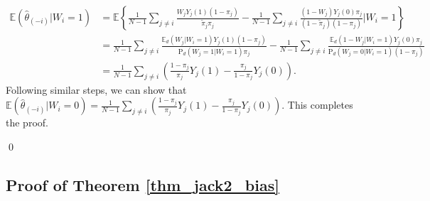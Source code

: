 \documentclass[12pt]{article}
\newcommand{\E}{{\mathbb{E}}}
\renewcommand{\Pr}{{\text{P}}}
\begin{document}
\begin{align}
\E(\hat{\theta}_{(-i)}|W_i = 1) &= \E\left\{\frac{1}{N-1}\sum_{j\neq i}\frac{W_jY_j(1)(1-\pi_j)}{\tilde{\pi}_j \pi_j} - \frac{1}{N-1}\sum_{j\neq i}\frac{(1-W_j)Y_j(0) {\pi}_j}{(1-\tilde{\pi}_j)(1-\pi_j)} \Bigg|W_i = 1 \right\} \nonumber\\
& = \frac{1}{N-1}\sum_{j\neq i}\frac{\E_d(W_j|W_i = 1)Y_j(1)(1-\pi_j)}{\Pr_d(W_j = 1|W_i = 1) \pi_j} - \frac{1}{N-1}\sum_{j\neq i}\frac{\E_d(1-W_j|W_i=1)Y_j(0) {\pi}_j}{\Pr_d(W_j = 0|W_i = 1)(1-\pi_j)} \nonumber\\
& = \frac{1}{N-1}\sum_{j \neq i}\left(\frac{1-\pi_j}{\pi_j}Y_j(1) - \frac{\pi_j}{1-\pi_j}Y_j(0)\right).
\end{align}
Following similar steps, we can show that $\E(\hat{\theta}_{(-i)}|W_i = 0) = \frac{1}{N-1}\sum_{j \neq i}\left(\frac{1-\pi_j}{\pi_j}Y_j(1) - \frac{\pi_j}{1-\pi_j}Y_j(0)\right)$. This completes the proof.

\qed


\subsection{Proof of Theorem \ref{thm_jack2_bias}}
\end{document}
